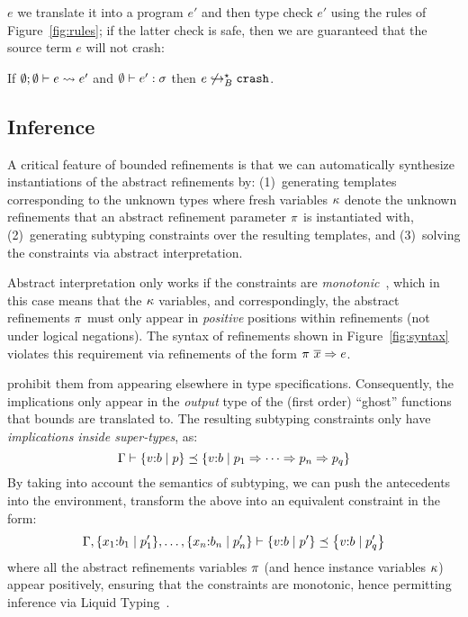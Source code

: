 $e$ we translate it
into a \corelan program $e'$ and then type check $e'$ using the rules of Figure~\ref{fig:rules}; 
if the latter check is safe, then we are guaranteed that the source term $e$ will
not crash:

\begin{theorem*}[Soundness]
\label{theorem:bounded}
If $ \emptyset; \emptyset \vdash e \rightsquigarrow e'$ and
   $\emptyset \vdash e' : \sigma$
then $e \not \hookrightarrow_B^{\star} {\mathtt{crash}} $.
\end{theorem*}

\subsection{Inference}\label{sec:infer}

A critical feature of bounded refinements is that we can
automatically synthesize instantiations of the abstract
refinements by:
%
(1)~generating templates corresponding to the unknown types
    where fresh variables $\kappa$ denote the unknown refinements
    that an abstract refinement parameter $\pi$ is instantiated
    with,
(2)~generating subtyping constraints over the resulting templates,
    and
(3)~solving the constraints via abstract interpretation.

Abstract interpretation only works if the constraints
are \emph{monotonic}~\citep{cousotcousot77}, which in this case
means that the $\kappa$ variables, and correspondingly,
the abstract refinements $\pi$ must only appear in
\emph{positive} positions within refinements (\ie not
under logical negations).
%
The syntax of refinements shown in Figure~\ref{fig:syntax}
violates this requirement via refinements of the
form ${\pi \ \overline{x}} \Rightarrow e$.
%

 \ie prohibit
them from appearing elsewhere in type specifications.
%
Consequently, the implications only appear in the
\emph{output} type of the (first order) ``ghost''
functions that bounds are translated to.
%
The resulting subtyping constraints only have
\emph{implications inside super-types}, \ie as:
$$
\Gamma \vdash \left\lbrace v\text{:}b\mid p\right\rbrace \preceq \left\lbrace v\text{:}b\mid p_1 \Rightarrow \dots \Rightarrow p_{n} \Rightarrow p_q\right\rbrace
$$
%
By taking into account the semantics of subtyping, we can
push the antecedents into the environment, \ie transform
the above into an equivalent constraint in the form:
$$
\isSubType{
\EXTT{
 \EXTT{\Gamma}{x_1}{\sxref{b_1}{\areft_1'}{x_1}},\dots
}{x_n}{\sxref{b_n}{\areft_n'}{x_n}}
}
{\stref{b}{\areft'}}
{\stref{b}{\areft_q'}}
$$
where all the abstract refinements variables $\pi$
(and hence instance variables $\kappa$) appear positively,
ensuring that the constraints are monotonic, hence permitting
inference via Liquid Typing~\citep{LiquidPLDI08}.

